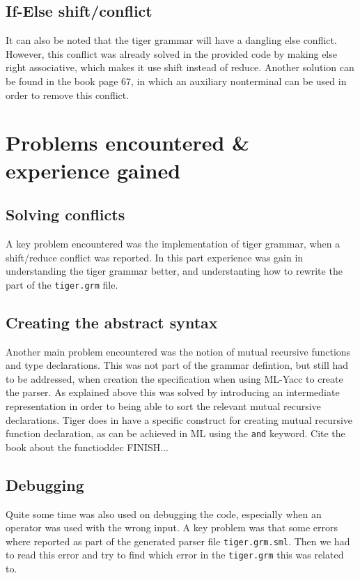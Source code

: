 \documentclass{article}
\begin{document}
\subsection{If-Else shift/conflict}
It can also be noted that the tiger grammar will have a dangling else conflict. However, this conflict was already solved in the provided code by making else right associative, which makes it use shift instead of reduce. Another solution can be found in the book page 67, in which an auxiliary nonterminal can be used in order to remove this conflict.

\section{Problems encountered \& experience gained}
\subsection{Solving conflicts}
A key problem encountered was the implementation of tiger grammar, when a shift/reduce conflict was reported. In this part experience was gain in understanding the tiger grammar better, and understanting how to rewrite the part of the \texttt{tiger.grm} file. 

\subsection{Creating the abstract syntax}
Another main problem encountered was the notion of mutual recursive functions and type declarations. This was not part of the grammar defintion, but still had to be addressed, when creation the specification when using ML-Yacc to create the parser. As explained above this was solved by introducing an intermediate representation in order to being able to sort the relevant mutual recursive declarations. Tiger does in have a specific construct for creating mutual recursive function declaration, as can be achieved in ML using the \texttt{and} keyword. Cite the book about the functioddec FINISH...

\subsection{Debugging}
Quite some time was also used on debugging the code, especially when an operator was used with the wrong input. A key problem was that some errors where reported as part of the generated parser file \texttt{tiger.grm.sml}. Then we had to read this error and try to find which error in the \texttt{tiger.grm} this was related to.
\end{document}
